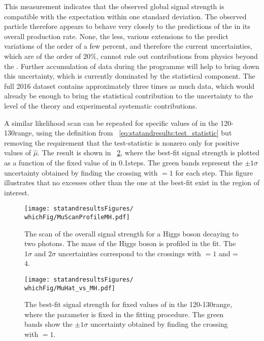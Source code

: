 This measurement indicates that the observed global signal strength is compatible with the \SM expectation within one standard deviation. The observed particle therefore appears to behave very closely to the predictions of the \SM in its overall production rate. None, the less, various extensions to the \SM predict variations of the order of a few percent, and therefore the current uncertainties, which are of the order of $20\%$, cannot rule out contributions from physics beyond the \SM. Further accumulation of data during the \LHC programme will help to bring down this uncertainty, which is currently dominated by the statistical component. The full 2016 dataset contains approximately three times as much data, which would already be enough to bring the statistical contribution to the uncertainty to the level of the theory and experimental systematic contributions.

A similar likelihood scan can be repeated for specific values of \mH in the 120-130\GeV range, using the \DNLL definition from \Eq~\ref{eq:statandresults:test_statistic} but removing the requirement that the test-statistic is nonzero only for positive values of $\hat{\mu}$.
The result is shown in \Fig~\ref{fig:statandresults:mu_vs_mh}, where the best-fit signal strength is plotted as a function of the fixed value of \mH in 0.1\GeV steps. The green bands represent the $\pm 1 \sigma$ uncertainty obtained by finding the crossing with \DNLL$=1$ for each step. This figure illustrates that no excesses other than the one at the best-fit exist in the region of interest. %

\begin{figure}[ht!]
\centering
\texttt{[image: statandresultsFigures/\\whichFig/MuScanProfileMH.pdf]} 
\caption{The \DNLL scan of the overall signal strength for a Higgs boson decaying to two photons. The mass of the Higgs boson is profiled in the fit. The $1\sigma$ and $2\sigma$ uncertainties correspond to the crossings with \DNLL$=1$ and \DNLL=$4$.}

\label{fig:statandresults:global_mu}
\end{figure}


\begin{figure}[ht!]
\centering
\texttt{[image: statandresultsFigures/\\whichFig/MuHat\_vs\_MH.pdf]} 
\caption{The best-fit signal strength for fixed values of \mH in the 120-130\GeV range, where the \mH parameter is fixed in the fitting procedure. The green bands show the $\pm 1 \sigma$ uncertainty obtained by finding the crossing with \DNLL$=1$. }

\label{fig:statandresults:mu_vs_mh}
\end{figure}

